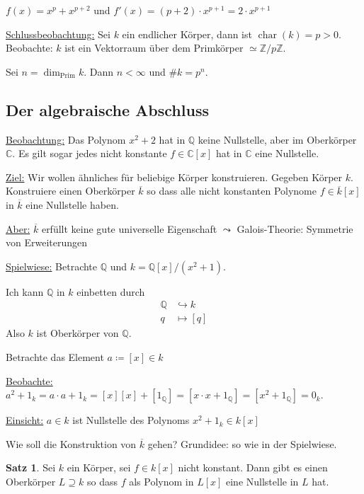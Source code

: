 \documentclass[12pt,parskip=full]{scrartcl}
\newcommand{\setZ}{\mathbb{Z}}
\newcommand{\setQ}{\mathbb{Q}}
\newcommand{\setC}{\mathbb{C}}
\newcommand{\heading}{\underline}
\theoremstyle{definition}
\newtheorem{theorem}{Satz}[section]
\theoremstyle{remark}
\begin{document}
	$f(x) = x^p + x^{p+2}$ und $f'(x) = (p + 2) \cdot x^{p+1} = 2 \cdot x^{p+1}$
	
	\heading{Schlussbeobachtung:} Sei $k$ ein endlicher Körper, dann ist $\operatorname{char}(k) = p > 0$. Beobachte: $k$ ist ein Vektorraum über dem Primkörper $\simeq \setZ / p \setZ$.
	
	Sei $n = \dim_\text{Prim} k$. Dann $n < \infty$ und $\#k = p^n$.
	
	\subsection{Der algebraische Abschluss}
	
	\heading{Beobachtung:} Das Polynom $x^2 + 2$ hat in $\setQ$ keine Nullstelle, aber im Oberkörper $\setC$. Es gilt sogar jedes nicht konstante $f \in \setC[x]$ hat in $\setC$ eine Nullstelle.
	
	\heading{Ziel:} Wir wollen ähnliches für beliebige Körper konstruieren. Gegeben Körper $k$. Konstruiere einen Oberkörper $\overline{k}$ so dass alle nicht konstanten Polynome $f \in \overline{k}[x]$ in $\overline{k}$ eine Nullstelle haben.
	
	\heading{Aber:} $\overline{k}$ erfüllt keine gute universelle Eigenschaft $\leadsto$ Galois-Theorie: Symmetrie von Erweiterungen
	
	\heading{Spielwiese:} Betrachte $\setQ$ und $k = \setQ[x]/(x^2 + 1)$.
	
	Ich kann $\setQ$ in $k$ einbetten durch
	\begin{align*}
		\setQ &\hookrightarrow k \\
		q &\mapsto [q]
	\end{align*}
	Also $k$ ist Oberkörper von $\setQ$.
	
	Betrachte das Element $a \coloneqq [x] \in k$
	
	\heading{Beobachte:} $a^2 + 1_k = a \cdot a + 1_k = [x] [x] + [1_\setQ] = [x \cdot x + 1_\setQ] = [x^2 + 1_\setQ] = 0_k$.
	
	\heading{Einsicht:} $a \in k$ ist Nullstelle des Polynoms $x^2 + 1_k \in k[x]$
	
	Wie soll die Konstruktion von $\overline{k}$ gehen? Grundidee: so wie in der Spielwiese.
	
	\begin{theorem}
		Sei $k$ ein Körper, sei $f \in k[x]$ nicht konstant. Dann gibt es einen Oberkörper $L \supseteq k$ so dass $f$ als Polynom in $L[x]$ eine Nullstelle in $L$ hat.
	\end{theorem}
\end{document}
